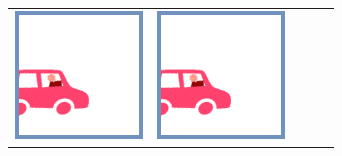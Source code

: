 \documentclass[12pt, a4paper]{article}
\begin{document}
\begin{minipage}{\textwidth}
\begin{table}[H]
\begin{tabulary}{\linewidth}{|C|CCCC|}
				\vspace{0.01cm}\includegraphics[width=\linewidth]{option1} &
				\vspace{0.01cm}\includegraphics[width=\linewidth]{option1} &

\end{tabulary}
\end{table}
\end{minipage}
\end{document}
